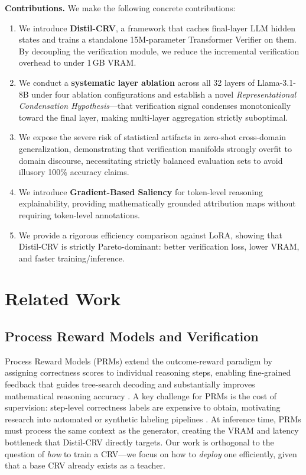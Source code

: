 \documentclass{article}
\begin{document}
\textbf{Contributions.} We make the following concrete contributions:
\begin{enumerate}[leftmargin=1.5em, topsep=2pt, itemsep=1pt]
  \item We introduce \textbf{Distil-CRV}, a framework that caches final-layer LLM hidden states and trains a standalone 15M-parameter Transformer Verifier on them. By decoupling the verification module, we reduce the incremental verification overhead to under 1\,GB VRAM.
  \item We conduct a \textbf{systematic layer ablation} across all 32 layers of Llama-3.1-8B under four ablation configurations and establish a novel \emph{Representational Condensation Hypothesis}---that verification signal condenses monotonically toward the final layer, making multi-layer aggregation strictly suboptimal.
  \item We expose the severe risk of statistical artifacts in zero-shot cross-domain generalization, demonstrating that verification manifolds strongly overfit to domain discourse, necessitating strictly balanced evaluation sets to avoid illusory 100\% accuracy claims.
  \item We introduce \textbf{Gradient-Based Saliency} for token-level reasoning explainability, providing mathematically grounded attribution maps without requiring token-level annotations.
  \item We provide a rigorous efficiency comparison against LoRA, showing that Distil-CRV is strictly Pareto-dominant: better verification loss, lower VRAM, and faster training/inference.
\end{enumerate}

\section{Related Work}
\label{sec:related}

\subsection{Process Reward Models and Verification}
Process Reward Models (PRMs) \citep{lightman2023lets} extend the outcome-reward paradigm by assigning correctness scores to individual reasoning steps, enabling fine-grained feedback that guides tree-search decoding and substantially improves mathematical reasoning accuracy \citep{cobbe2021training}. A key challenge for PRMs is the cost of supervision: step-level correctness labels are expensive to obtain, motivating research into automated or synthetic labeling pipelines \citep{wang2023math}. At inference time, PRMs must process the same context as the generator, creating the VRAM and latency bottleneck that Distil-CRV directly targets. Our work is orthogonal to the question of \emph{how} to train a CRV---we focus on how to \emph{deploy} one efficiently, given that a base CRV already exists as a teacher.
\end{document}
